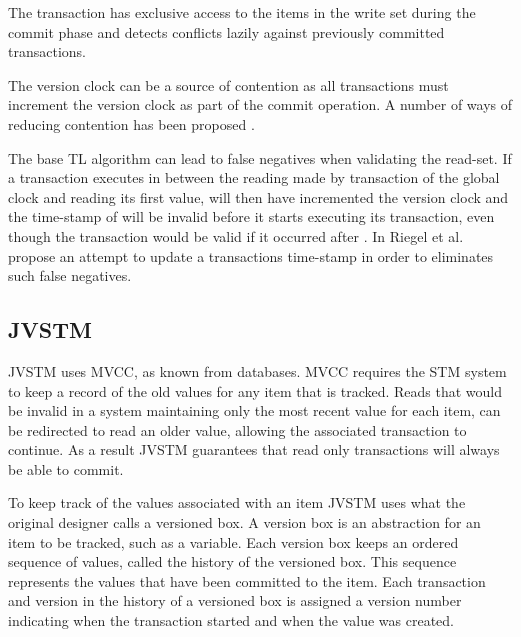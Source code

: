 The transaction has exclusive access to the items in the write set during the commit phase and detects conflicts lazily against previously committed transactions. 

The version clock can be a source of contention as all transactions must increment the version clock as part of the commit operation\cite[p. 120]{harris2010transactional}. A number of ways of reducing contention has been proposed \cite{zhang2008commit}\cite{lev2009anatomy}\cite{avni2008maintaining}.

The base TL algorithm can lead to false negatives when validating the read-set. If a transaction  executes in between the reading made by transaction  of the global clock and reading its first value,  will then have incremented the version clock and the time-stamp of  will be invalid before it starts executing its transaction, even though the transaction would be valid if it occurred after . In \cite{riegel2007time} Riegel et al. propose an attempt to update a transactions time-stamp in order to eliminates such false negatives.

\subsection{JVSTM}
JVSTM uses \ac{MVCC}\cite[p. 1]{fernandes2011lock}, as known from databases\cite[p. 791]{elmasri2011fundamentals}. \ac{MVCC} requires the \ac{STM} system to keep a record of the old values for any item that is tracked\cite[p. 791]{elmasri2011fundamentals}. Reads that would be invalid in a system maintaining only the most recent value for each item, can be redirected to read an older value, allowing the associated transaction to continue\cite[p. 791]{elmasri2011fundamentals}. As a result JVSTM guarantees that read only transactions will always be able to commit\cite[p. 97]{cachopo2007development}.

To keep track of the values associated with an item JVSTM uses what the original designer calls a versioned box\cite[p. 63]{cachopo2007development}. A version box is an abstraction for an item to be tracked, such as a variable. Each version box keeps an ordered sequence of values, called the history of the versioned box. This sequence represents the values that have been committed to the item. Each transaction and version in the history of a versioned box is assigned a version number indicating when the transaction started and when the value was created.

